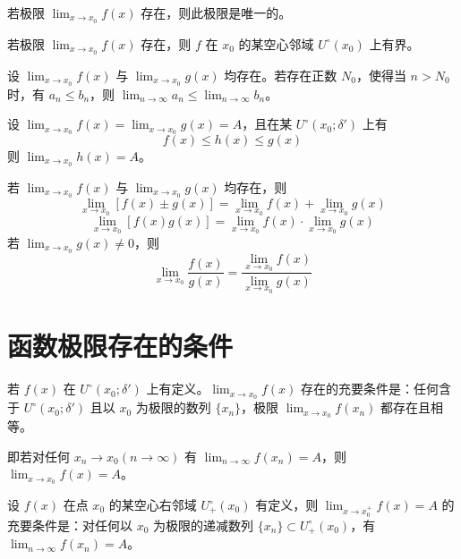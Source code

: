 \begin{theorem}[唯一性]
    若极限 $\displaystyle\lim_{x \to x_0}f(x)$ 存在，则此极限是唯一的。
\end{theorem}

\begin{theorem}[局部有界性]
    若极限 $\displaystyle\lim_{x \to x_0}f(x)$ 存在，则 $f$ 在 $x_0$ 的某空心邻域 $U^\circ(x_0)$ 上有界。
\end{theorem}

\begin{theorem}[保不等式性]
    设 $\lim_{x \to x_0}f(x)$ 与 $\lim_{x \to x_0}g(x)$ 均存在。若存在正数 $N_0$，使得当 $n>N_0$ 时，有 $a_n\leqslant b_n$，则 $\displaystyle\lim_{n\to \infty}a_n \leqslant \lim_{n\to \infty}b_n$。
\end{theorem}

\begin{theorem}[迫敛性]
    设 $\displaystyle\lim_{x \to x_0}f(x) = \lim_{x \to x_0}g(x) = A$，且在某 $U^\circ(x_0;\delta')$ 上有
    $$f(x)\leqslant h(x) \leqslant g(x)$$
    则 $\lim_{x \to x_0}h(x) = A$。
\end{theorem}

\begin{theorem}[四则运算法则]
    若 $\displaystyle\lim_{x \to x_0}f(x)$ 与 $\displaystyle\lim_{x \to x_0}g(x)$ 均存在，则
    $$\lim_{x \to x_0}[f(x)\pm g(x)] = \lim_{x \to x_0}f(x) + \lim_{x \to x_0}g(x)$$
    $$\lim_{x \to x_0}[f(x)g(x)] = \lim_{x \to x_0}f(x) \cdot \lim_{x \to x_0}g(x)$$
    若 $\displaystyle\lim_{x \to x_0}g(x)\ne 0$，则
    $$\lim_{x \to x_0}\frac{f(x)}{g(x)} = \frac{\lim_{x \to x_0}f(x)}{\lim_{x \to x_0}g(x)}$$
\end{theorem}

\section{函数极限存在的条件}

\begin{theorem}
    若 $f(x)$ 在 $U^\circ(x_0;\delta')$ 上有定义。$\displaystyle\lim_{x \to x_0}f(x)$ 存在的充要条件是：任何含于 $U^\circ(x_0;\delta')$ 且以 $x_0$ 为极限的数列 $\{x_n\}$，极限 $\displaystyle\lim_{x \to x_0}f(x_n)$ 都存在且相等。
\end{theorem}

即若对任何 $x_n\to x_0(n\to \infty)$ 有 $\displaystyle\lim_{n\to \infty}f(x_n) = A$，则 $\displaystyle\lim_{x \to x_0}f(x)=A$。

\begin{theorem}
    设 $f(x)$ 在点 $x_0$ 的某空心右邻域 $U_+^\circ(x_0)$ 有定义，则 $\displaystyle\lim_{x \to x_0^+}f(x)=A$ 的充要条件是：对任何以 $x_0$ 为极限的递减数列 $\{x_n\}\subset U_+^\circ(x_0)$，有 $\displaystyle\lim_{n\to \infty}f(x_n) = A$。
\end{theorem}


